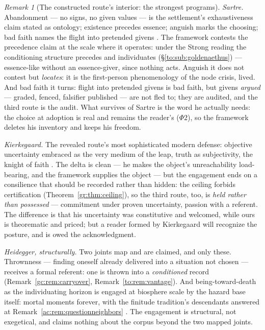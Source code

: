 \documentclass[11pt]{article}
\numberwithin{equation}{section}
\theoremstyle{plain}
\theoremstyle{definition}
\theoremstyle{remark}
\newtheorem{remark}[theorem]{Remark}
\begin{document}
\begin{remark}[The constructed route's interior: the strongest
programs]
\emph{Sartre.} Abandonment --- no signs, no given values --- is the
settlement's exhaustiveness claim stated as ontology; existence
precedes essence; anguish marks the choosing; bad faith names the
flight into pretended givens \cite{Sartre46}. The framework contests
the precedence claim at the scale where it operates: under the Strong
reading the conditioning structure precedes and individuates
(\S\ref{to:sub:goldenaethus}) --- essence-like without an
essence-giver, since nothing acts. Anguish it does not contest but
\emph{locates}: it is the first-person phenomenology of the node
crisis, lived. And bad faith it turns: flight into pretended givens
is bad faith, but givens \emph{argued} --- graded, fenced, falsifier
published --- are not fled to; they are audited, and the third route
is the audit. What survives of Sartre is the word he actually needs:
the choice at adoption is real and remains the reader's
($\Phi2$), so the framework deletes his inventory and keeps his
freedom.

\emph{Kierkegaard.} The revealed route's most sophisticated modern
defense: objective uncertainty embraced as the very medium of the
leap, truth as subjectivity, the knight of faith
\cite{Kie1846}. The delta is clean --- he makes the object's
unreachability load-bearing, and the framework supplies the object
--- but the engagement ends on a consilience that should be recorded
rather than hidden: the ceiling forbids certification
(Theorem~\ref{gr:thm:ceiling}), so the third route, too, is
\emph{held rather than possessed} --- commitment under proven
uncertainty, passion with a referent. The difference is that his
uncertainty was constitutive and welcomed, while ours is theorematic
and priced; but a reader formed by Kierkegaard will recognize the
posture, and is owed the acknowledgment.

\emph{Heidegger, structurally.} Two joints map and are claimed, and
only these. Thrownness --- finding oneself already delivered into a
situation not chosen --- receives a formal referent: one is thrown
into a \emph{conditioned} record (Remark~\ref{gc:rem:carryover},
Remark~\ref{to:rem:vantage}). And being-toward-death as the
individuating horizon is engaged at biosphere scale by the hazard
base itself: mortal moments forever, with the finitude tradition's
descendants answered at Remark~\ref{ac:rem:questionneighbors}
\cite{Hei27}. The engagement is structural, not exegetical, and
claims nothing about the corpus beyond the two mapped joints.
\end{remark}
\end{document}
